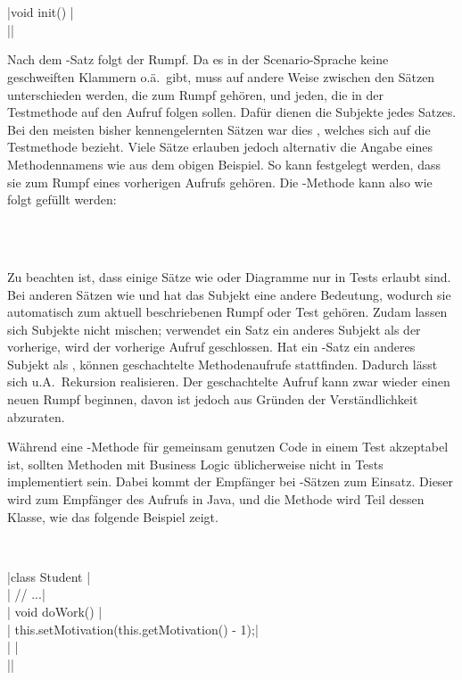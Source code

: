 \\
\\
\jcode|void init() {|\\
\jcode|}|

Nach dem -Satz folgt der Rumpf.
Da es in der Scenario-Sprache keine geschweiften Klammern o.ä.\ gibt,
muss auf andere Weise zwischen den Sätzen unterschieden werden, die zum Rumpf gehören,
und jeden, die in der Testmethode auf den Aufruf folgen sollen.
Dafür dienen die Subjekte jedes Satzes.
Bei den meisten bisher kennengelernten Sätzen war dies , welches sich auf die Testmethode bezieht.
Viele Sätze erlauben jedoch alternativ die Angabe eines Methodennamens wie  aus dem obigen Beispiel.
So kann festgelegt werden, dass sie zum Rumpf eines vorherigen Aufrufs gehören.
Die -Methode kann also wie folgt gefüllt werden:

\\
\\

Zu beachten ist, dass einige Sätze wie  oder Diagramme nur in Tests erlaubt sind.
Bei anderen Sätzen wie  und  hat das Subjekt eine andere Bedeutung,
wodurch sie automatisch zum aktuell beschriebenen Rumpf oder Test gehören.
Zudam lassen sich Subjekte nicht mischen;
verwendet ein Satz ein anderes Subjekt als der vorherige, wird der vorherige Aufruf geschlossen.
Hat ein -Satz ein anderes Subjekt als , können geschachtelte Methodenaufrufe stattfinden.
Dadurch lässt sich u.A.\ Rekursion realisieren.
Der geschachtelte Aufruf kann zwar wieder einen neuen Rumpf beginnen, davon ist jedoch aus Gründen der Verständlichkeit abzuraten.

Während eine -Methode für gemeinsam genutzen Code in einem Test akzeptabel ist,
sollten Methoden mit Business Logic üblicherweise nicht in Tests implementiert sein.
Dabei kommt der Empfänger bei -Sätzen zum Einsatz.
Dieser wird zum Empfänger des Aufrufs in Java, und die Methode wird Teil dessen Klasse, wie das folgende Beispiel zeigt.

\\


\jcode|class Student {|\\
\jcode|    // ...|\\
\jcode|    void doWork() {|\\
\jcode|        this.setMotivation(this.getMotivation() - 1);|\\
\jcode|    }|\\
\jcode|}|

